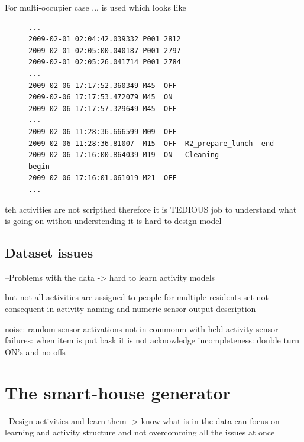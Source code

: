 \documentclass[12pt, a4paper, pdflatex, leqno, twoside, openright]{report}
\begin{document}
For multi-occupier case ... is used which looks like

\begin{figure}[htb]
  \begin{lstlisting}
...
2009-02-01 02:04:42.039332 P001 2812
2009-02-01 02:05:00.040187 P001 2797
2009-02-01 02:05:26.041714 P001 2784
...
2009-02-06 17:17:52.360349 M45  OFF
2009-02-06 17:17:53.472079 M45  ON
2009-02-06 17:17:57.329649 M45  OFF
...
2009-02-06 11:28:36.666599 M09  OFF
2009-02-06 11:28:36.81007  M15  OFF  R2_prepare_lunch  end
2009-02-06 17:16:00.864039 M19  ON   Cleaning          begin
2009-02-06 17:16:01.061019 M21  OFF
...
  \end{lstlisting}
\end{figure}

teh activities are not scripthed therefore it is TEDIOUS job to understand what is going on
withou understending it is hard to design model


    \subsection{Dataset issues}
--Problems with the data -> hard to learn activity models

but not all activities are assigned to people for multiple residents set
not consequent in activity naming and numeric sensor output description


noise: random sensor activations not in commonm with held activity
sensor failures: when item is put bask it is not acknowledge
incompleteness: double turn ON's and no offs








  \section{The smart-house generator}
--Design activities and learn them -> know what is in the data
can focus on learning and activity structure and not overcomming all the issues at once
\end{document}
